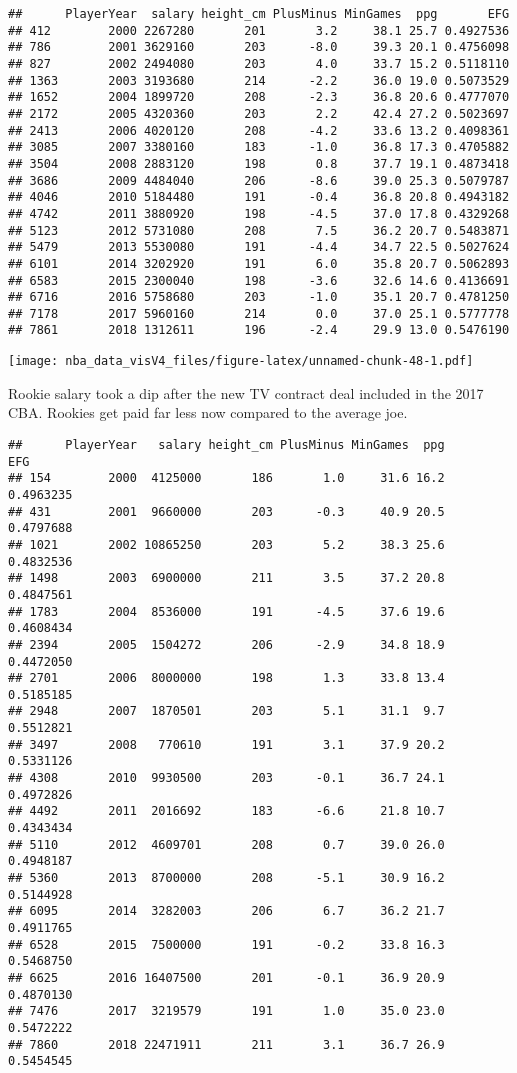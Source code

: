 \documentclass[]{article}
\begin{document}
\begin{verbatim}
##      PlayerYear  salary height_cm PlusMinus MinGames  ppg       EFG
## 412        2000 2267280       201       3.2     38.1 25.7 0.4927536
## 786        2001 3629160       203      -8.0     39.3 20.1 0.4756098
## 827        2002 2494080       203       4.0     33.7 15.2 0.5118110
## 1363       2003 3193680       214      -2.2     36.0 19.0 0.5073529
## 1652       2004 1899720       208      -2.3     36.8 20.6 0.4777070
## 2172       2005 4320360       203       2.2     42.4 27.2 0.5023697
## 2413       2006 4020120       208      -4.2     33.6 13.2 0.4098361
## 3085       2007 3380160       183      -1.0     36.8 17.3 0.4705882
## 3504       2008 2883120       198       0.8     37.7 19.1 0.4873418
## 3686       2009 4484040       206      -8.6     39.0 25.3 0.5079787
## 4046       2010 5184480       191      -0.4     36.8 20.8 0.4943182
## 4742       2011 3880920       198      -4.5     37.0 17.8 0.4329268
## 5123       2012 5731080       208       7.5     36.2 20.7 0.5483871
## 5479       2013 5530080       191      -4.4     34.7 22.5 0.5027624
## 6101       2014 3202920       191       6.0     35.8 20.7 0.5062893
## 6583       2015 2300040       198      -3.6     32.6 14.6 0.4136691
## 6716       2016 5758680       203      -1.0     35.1 20.7 0.4781250
## 7178       2017 5960160       214       0.0     37.0 25.1 0.5777778
## 7861       2018 1312611       196      -2.4     29.9 13.0 0.5476190
\end{verbatim}

\texttt{[image: nba\_data\_visV4\_files/figure-latex/unnamed-chunk-48-1.pdf]}

Rookie salary took a dip after the new TV contract deal included in the
2017 CBA. Rookies get paid far less now compared to the average joe.

\begin{verbatim}
##      PlayerYear   salary height_cm PlusMinus MinGames  ppg       EFG
## 154        2000  4125000       186       1.0     31.6 16.2 0.4963235
## 431        2001  9660000       203      -0.3     40.9 20.5 0.4797688
## 1021       2002 10865250       203       5.2     38.3 25.6 0.4832536
## 1498       2003  6900000       211       3.5     37.2 20.8 0.4847561
## 1783       2004  8536000       191      -4.5     37.6 19.6 0.4608434
## 2394       2005  1504272       206      -2.9     34.8 18.9 0.4472050
## 2701       2006  8000000       198       1.3     33.8 13.4 0.5185185
## 2948       2007  1870501       203       5.1     31.1  9.7 0.5512821
## 3497       2008   770610       191       3.1     37.9 20.2 0.5331126
## 4308       2010  9930500       203      -0.1     36.7 24.1 0.4972826
## 4492       2011  2016692       183      -6.6     21.8 10.7 0.4343434
## 5110       2012  4609701       208       0.7     39.0 26.0 0.4948187
## 5360       2013  8700000       208      -5.1     30.9 16.2 0.5144928
## 6095       2014  3282003       206       6.7     36.2 21.7 0.4911765
## 6528       2015  7500000       191      -0.2     33.8 16.3 0.5468750
## 6625       2016 16407500       201      -0.1     36.9 20.9 0.4870130
## 7476       2017  3219579       191       1.0     35.0 23.0 0.5472222
## 7860       2018 22471911       211       3.1     36.7 26.9 0.5454545
\end{verbatim}
\end{document}
